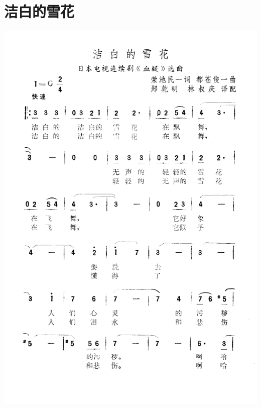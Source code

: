 \documentclass[cn,pad,chinese,chinesefont=nofont]{elegantbook}
\begin{document}
\section{洁白的雪花}
    \includegraphics[height=0.9\textheight]{dongxiao/日本-洁白的雪花.png}
\end{document}
